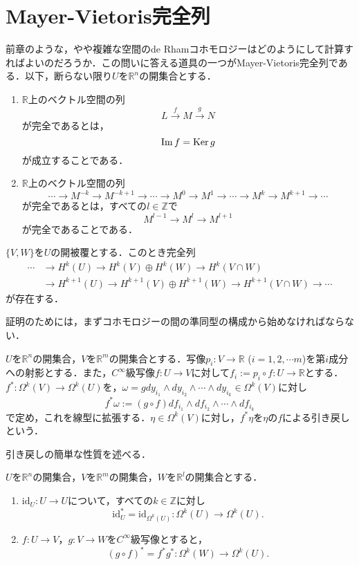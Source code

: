 \documentclass[uplatex]{jsarticle}
\begin{document}
\section{Mayer-Vietoris完全列}
前章のような，やや複雑な空間のde Rhamコホモロジーはどのようにして計算すればよいのだろうか．この問いに答える道具の一つがMayer-Vietoris完全列である．以下，断らない限り$U$を$\mathbb{R}^n$の開集合とする．
\begin{definition}
\begin{enumerate}[label=(\arabic*)]
\item $\mathbb{R}$上のベクトル空間の列
\[ L\stackrel{f}{\to}M\stackrel{g}{\to}N \]
が完全であるとは，
\[ \operatorname{Im} f=\operatorname{Ker} g \]
が成立することである．
\item $\mathbb{R}$上のベクトル空間の列
\[ \cdots\to M^{-k}\to M^{-k+1}\to\cdots\to M^0\to M^1\to\cdots\to M^{k}\to M^{k+1}\to\cdots \]
が完全であるとは，すべての$l\in \mathbb{Z}$で
\[ M^{l-1}\to M^l\to M^{l+1} \]
が完全であることである．
\end{enumerate}
\end{definition}
\begin{theorem}\label{thm1}
$\{V,W\}$を$U$の開被覆とする．このとき完全列
\begin{align*}
\cdots&\to H^k(U)\to H^k(V)\oplus H^k(W)\to H^k(V\cap W) \\
&\to H^{k+1}(U)\to H^{k+1}(V)\oplus H^{k+1}(W)\to H^{k+1}(V\cap W)\to\cdots
\end{align*}
が存在する．
\end{theorem}
証明のためには，まずコホモロジーの間の準同型の構成から始めなければならない．
\begin{definition}
$U$を$\mathbb{R}^n$の開集合，$V$を$\mathbb{R}^m$の開集合とする．写像$p_i\colon V\to \mathbb{R}$ ($i=1,2,\cdots m$)を第$i$成分への射影とする．また，$C^{\infty}$級写像$f\colon U\to V$に対して$f_i:=p_i\circ f\colon U\to\mathbb{R}$とする．$f^*\colon \Omega^k(V)\to\Omega^k(U)$を，$\omega=gdy_{i_1}\wedge dy_{i_2}\wedge\cdots\wedge dy_{i_k}\in\Omega^k(V)$に対し
\[ f^*\omega:=\left(g\circ f\right)df_{i_1}\wedge df_{i_2}\wedge\cdots\wedge df_{i_k} \]
で定め，これを線型に拡張する．$\eta\in\Omega^k(V)$に対し，$f^*\eta$を$\eta$の$f$による引き戻しという．
\end{definition}
引き戻しの簡単な性質を述べる．
\begin{proposition}
$U$を$\mathbb{R}^n$の開集合，$V$を$\mathbb{R}^m$の開集合，$W$を$\mathbb{R}^l$の開集合とする．
\begin{enumerate}[label=(\arabic*)]
\item $\mathrm{id}_U\colon U\to U$について，すべての$k\in\mathbb{Z}$に対し
\[ \mathrm{id}^*_U=\mathrm{id}_{\Omega^k(U)}\colon \Omega^k(U)\to \Omega^k(U). \]
\item $f\colon U\to V$，$g\colon V\to W$を$C^{\infty}$級写像とすると，
\[ \left(g\circ f\right)^*=f^*g^*\colon \Omega^k(W)\to \Omega^k(U). \]
\end{enumerate}
\end{proposition}
\end{document}
